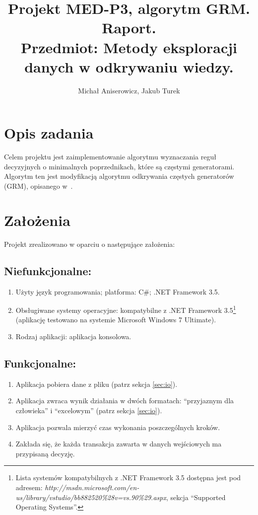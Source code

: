 \documentclass[a4paper,10pt]{article}
\title{Projekt MED-P3, algorytm GRM. Raport. \\ \small{Przedmiot: Metody eksploracji danych w odkrywaniu wiedzy.}}
\author{Michał Aniserowicz, Jakub Turek}
\date{}
\begin{document}
\maketitle

\section{Opis zadania} \label{sec:task_desc}
Celem projektu jest zaimplementowanie algorytmu wyznaczania reguł decyzyjnych o minimalnych poprzednikach, które są częstymi generatorami.
Algorytm ten jest modyfikacją algorytmu odkrywania częstych generatorów (GRM), opisanego w~\cite{grm}.



\section{Założenia} \label{sec:assumptions}
Projekt zrealizowano w oparciu o następujące założenia:

\subsection*{Niefunkcjonalne:}
 \begin{enumerate}
  \item Użyty język programowania; platforma: C\#; .NET Framework 3.5.
  \item Obsługiwane systemy operacyjne: kompatybilne z .NET Framework 3.5\footnote{Lista systemów kompatybilnych z .NET Framework 3.5 dostępna jest pod adresem: \emph{http://msdn.microsoft.com/en-us/library/vstudio/bb882520\%28v=vs.90\%29.aspx}, sekcja ``Supported Operating Systems''.} (aplikację testowano na systemie Microsoft Windows 7 Ultimate).
  \item Rodzaj aplikacji: aplikacja konsolowa.
\end{enumerate}

\subsection*{Funkcjonalne:}
 \begin{enumerate}
  \item Aplikacja pobiera dane z pliku (patrz sekcja \ref{sec:io}).
  \item Aplikacja zwraca wynik działania w dwóch formatach: ``przyjaznym dla człowieka'' i ``excelowym'' (patrz sekcja \ref{sec:io}).
  \item Aplikacja pozwala mierzyć czas wykonania poszczególnych kroków.
  \item Zakłada się, że każda transakcja zawarta w danych wejściowych ma przypisaną decyzję.
 \end{enumerate}
\end{document}

